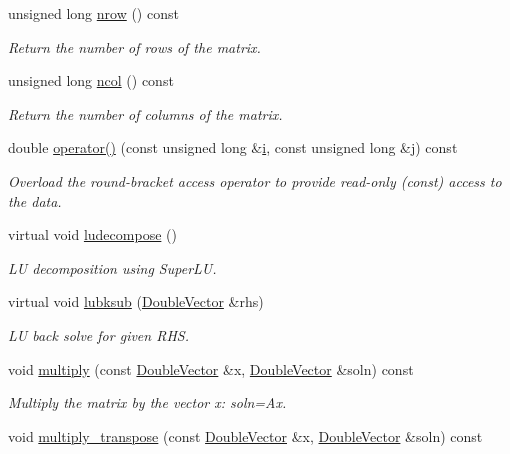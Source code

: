 \begin{DoxyCompactItemize}
unsigned long \hyperlink{classoomph_1_1CCDoubleMatrix_ab541153fa5ab2c1bc18e5339bacadfb9}{nrow} () const
\begin{DoxyCompactList}\small\item\em Return the number of rows of the matrix. \end{DoxyCompactList}\item 
unsigned long \hyperlink{classoomph_1_1CCDoubleMatrix_aa38cc544ab30f9318161763e13c20957}{ncol} () const
\begin{DoxyCompactList}\small\item\em Return the number of columns of the matrix. \end{DoxyCompactList}\item 
double \hyperlink{classoomph_1_1CCDoubleMatrix_a2fd1f3dfa66ed45be1ced60d2835634c}{operator()} (const unsigned long \&\hyperlink{cfortran_8h_adb50e893b86b3e55e751a42eab3cba82}{i}, const unsigned long \&j) const
\begin{DoxyCompactList}\small\item\em Overload the round-\/bracket access operator to provide read-\/only (const) access to the data. \end{DoxyCompactList}\item 
virtual void \hyperlink{classoomph_1_1CCDoubleMatrix_acb7c9b4e04b877b3ef40be905829eb41}{ludecompose} ()
\begin{DoxyCompactList}\small\item\em LU decomposition using Super\+LU. \end{DoxyCompactList}\item 
virtual void \hyperlink{classoomph_1_1CCDoubleMatrix_a59fbc30e6a856794cd2678856c8aea6d}{lubksub} (\hyperlink{classoomph_1_1DoubleVector}{Double\+Vector} \&rhs)
\begin{DoxyCompactList}\small\item\em LU back solve for given R\+HS. \end{DoxyCompactList}\item 
void \hyperlink{classoomph_1_1CCDoubleMatrix_add24c25e344b84fb5b732e294af5e8b2}{multiply} (const \hyperlink{classoomph_1_1DoubleVector}{Double\+Vector} \&x, \hyperlink{classoomph_1_1DoubleVector}{Double\+Vector} \&soln) const
\begin{DoxyCompactList}\small\item\em Multiply the matrix by the vector x\+: soln=Ax. \end{DoxyCompactList}\item 
void \hyperlink{classoomph_1_1CCDoubleMatrix_a582352912b0a7e097f9ac31c5054beed}{multiply\+\_\+transpose} (const \hyperlink{classoomph_1_1DoubleVector}{Double\+Vector} \&x, \hyperlink{classoomph_1_1DoubleVector}{Double\+Vector} \&soln) const

\end{DoxyCompactItemize}
